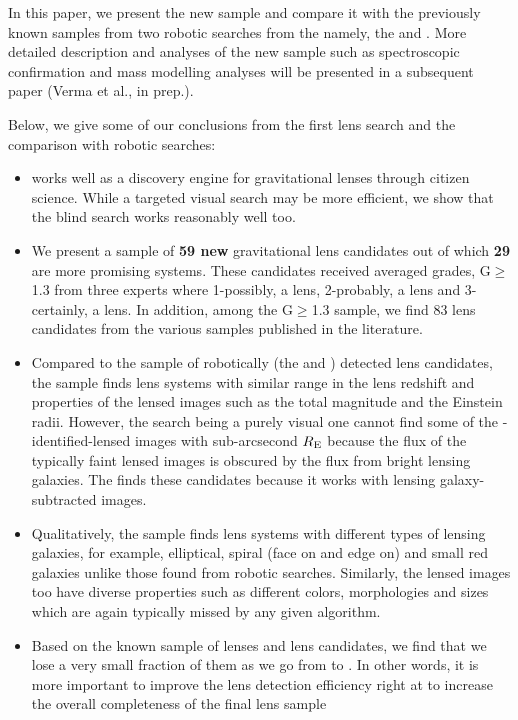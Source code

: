 \documentclass[useAMS,usenatbib,a4paper]{mn2e}
\begin{document}
In this paper, we present the new \sw sample and compare it
with the previously known samples from two robotic searches from the
\cfhtls namely, the \rf and \af. More detailed description and analyses
of the new sample such as spectroscopic confirmation and mass modelling
analyses will be presented in a subsequent \sw paper (Verma et al., in
prep.).

Below, we give some of our conclusions from the first \sw lens search
and the comparison with robotic searches:
\begin{itemize}

\item \sw works well as a discovery engine for gravitational lenses
through citizen science. While a targeted visual search may be more
efficient, we show that the blind search works reasonably well too.

\item We present a sample of {\bf 59 new} gravitational lens candidates
out of which {\bf 29} are more promising systems. These candidates received
averaged grades, G$\ge$1.3 from three experts where 1-possibly, a lens,
2-probably, a lens and 3-certainly, a lens. In addition, among the
G$\ge$1.3 sample, we find 83 lens candidates from the various samples
published in the literature.

\item Compared to the sample of robotically (the \rf and \af) detected
lens candidates, the \sw sample finds lens systems with similar range in
the lens redshift and properties of the lensed images such as the total
magnitude and the Einstein radii. However, the \sw search being a purely
visual one cannot find some of the \rf-identified-lensed images with
sub-arcsecond $R_{\rm E}$ because the flux of the typically faint
lensed images is obscured by the flux from bright lensing galaxies. The
\rf finds these candidates because it works with lensing
galaxy-subtracted images.

\item Qualitatively, the \sw sample finds lens systems with different
types of lensing galaxies, for example, elliptical, spiral (face on and
edge on) and small red galaxies unlike those found from robotic
searches. Similarly, the lensed images too have diverse properties such
as different colors, morphologies and sizes which are again typically
missed by any given algorithm.

\item Based on the known sample of lenses and lens candidates, we find
that we lose a very small fraction of them as we go from \StageOne to
\StageTwo. In other words, it is more important to improve the lens
detection efficiency right at \StageOne to increase the overall
completeness of the final lens sample


\end{itemize}
\end{document}
